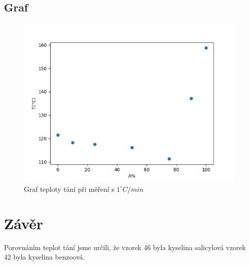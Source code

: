 \documentclass[13pt, a4paper, twoside]{article}
\begin{document}
\begin{enumerate}
\subsection*{Graf}
\begin{figure}[H]
    \centering
    \includegraphics[width=5in]{teplota_tani_graf.png}
    \caption*{Graf teploty tání při měření s $1^{\circ}C/min$}
\end{figure}

\section*{Závěr}
Porovnáním teplot tání jsme určili, že vzorek 46 byla kyselina salicylová vzorek 42 byla kyselina benzoová.




\end{enumerate}
\end{document}
